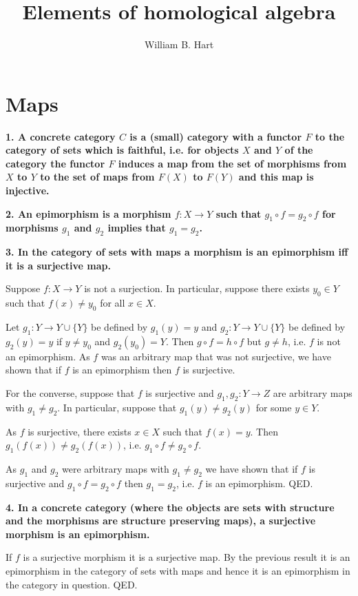 \documentclass[12pt]{article}
\title{Elements of homological algebra}
\author{
William B. Hart
}
\begin{document}
\maketitle

\tableofcontents

\section{Maps}

\textbf{1. A concrete category $C$ is a (small) category with a functor $F$ to the category of sets which is faithful, i.e. for objects $X$ and $Y$ of the category the functor $F$ induces a map from the set of morphisms from $X$ to $Y$ to the set of maps from $F(X)$ to $F(Y)$ and this map is injective.}

\textbf{2. An epimorphism is a morphism $f : X \to Y$ such that $g_1\circ f = g_2\circ f$ for morphisms $g_1$ and $g_2$ implies that $g_1 = g_2$.}

\textbf{3. In the category of sets with maps a morphism is an epimorphism iff it is a surjective map.}

Suppose $f : X \to Y$ is not a surjection. In particular, suppose there exists $y_0 \in Y$ such that $f(x) \neq y_0$ for all $x \in X$.

Let $g_1 : Y \to Y \cup \{Y\}$ be defined by $g_1(y) = y$ and $g_2 : Y \to Y \cup \{Y\}$ be defined by $g_2(y) = y$ if $y \neq y_0$ and $g_2(y_0) = Y$. Then $g\circ f = h\circ f$ but $g \neq h$, i.e. $f$ is not an epimorphism. As $f$ was an arbitrary map that was not surjective, we have shown that if $f$ is an epimorphism then $f$ is surjective. 

For the converse, suppose that $f$ is surjective and $g_1, g_2 : Y \to Z$ are arbitrary maps with $g_1 \neq g_2$. In particular, suppose that $g_1(y) \neq g_2(y)$ for some $y \in Y$.

As $f$ is surjective, there exists $x \in X$ such that $f(x) = y$. Then $g_1(f(x)) \neq g_2(f(x))$, i.e. $g_1\circ f \neq g_2\circ f$.

As $g_1$ and $g_2$ were arbitrary maps with $g_1 \neq g_2$ we have shown that if $f$ is surjective and $g_1\circ f = g_2\circ f$ then $g_1 = g_2$, i.e. $f$ is an epimorphism. QED.

\textbf{4. In a concrete category (where the objects are sets with structure and the morphisms are structure preserving maps), a surjective morphism is an epimorphism.}

If $f$ is a surjective morphism it is a surjective map. By the previous result it is an epimorphism in the category of sets with maps and hence it is an epimorphism in the category in question. QED.
\end{document}
